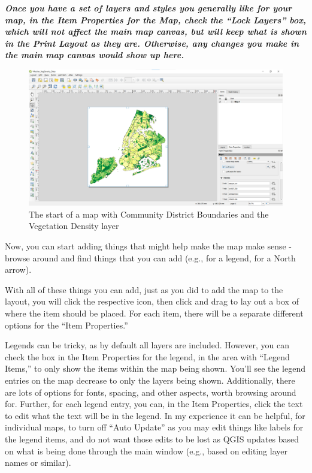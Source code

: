 \documentclass[
  letterpaper,
  DIV=11,
  numbers=noendperiod]{scrreprt}
\begin{document}
\textbf{\emph{Once you have a set of layers and styles you generally
like for your map, in the Item Properties for the Map, check the ``Lock
Layers'' box, which will not affect the main map canvas, but will keep
what is shown in the Print Layout as they are. Otherwise, any changes
you make in the main map canvas would show up here.}}

\begin{figure}

{\centering \includegraphics{./images/PrintLayout_DesiredLayers.png}

}

\caption{The start of a map with Community District Boundaries and the
Vegetation Density layer}

\end{figure}

Now, you can start adding things that might help make the map make sense
- browse around and find things that you can add (e.g.,
 for a legend,
 for a North arrow).

With all of these things you can add, just as you did to add the map to
the layout, you will click the respective icon, then click and drag to
lay out a box of where the item should be placed. For each item, there
will be a separate different options for the ``Item Properties.''

Legends can be tricky, as by default all layers are included. However,
you can check the box in the Item Properties for the legend, in the area
with ``Legend Items,'' to only show the items within the map being
shown. You'll see the legend entries on the map decrease to only the
layers being shown. Additionally, there are lots of options for fonts,
spacing, and other aspects, worth browsing around for. Further, for each
legend entry, you can, in the Item Properties, click the text to edit
what the text will be in the legend. In my experience it can be helpful,
for individual maps, to turn off ``Auto Update'' as you may edit things
like labels for the legend items, and do not want those edits to be lost
as QGIS updates based on what is being done through the main window
(e.g., based on editing layer names or similar).
\end{document}
